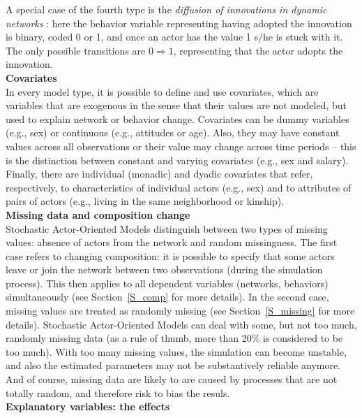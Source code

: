 \documentclass[a4paper,fleqn,11pt]{article}
\newcommand{\+}{\, + \,}
\newcommand{\saom}{{Stochastic Actor-Oriented Model}}
\begin{document}
A special case of the fourth type is the
\emph{diffusion of innovations in dynamic networks}
\citep{Greenan14}:
here the behavior variable representing
having adopted the innovation is binary, coded 0 or 1, and
once an actor has the value 1 s/he is stuck with it.
The only possible transitions are $0 \Rightarrow 1$, representing
that the actor adopts the innovation.\\

\noindent
\textbf{Covariates}\\

In every model type, it is possible to define and use covariates,
which are variables that are exogenous in the sense that
their values are not modeled, but used to explain network or behavior
change. Covariates can be dummy variables (e.g., sex)
or continuous (e.g., attitudes or age).
Also, they may have constant values across all observations or their
value may change across time periods -- this is the
distinction between constant and varying covariates
(e.g., sex and salary). Finally, there are
individual (monadic) and dyadic covariates that refer, respectively, to
characteristics of individual actors (e.g., sex) and to attributes
of pairs of actors (e.g., living in the same neighborhood or kinship).\\

\noindent
\textbf{Missing data and composition change}\\

{\saom}s distinguish between two types
of missing values: absence of actors from the network and
random missingness. The first case refers to changing composition:
it is possible to specify that some actors leave or join the
network between two observations (during the simulation process).
This then applies to all dependent variables (networks, behaviors)
simultaneously (see Section~\ref{S_comp} for more details).
In the second case, missing values are treated as randomly missing
(see Section~\ref{S_missing} for more details).
{\saom}s can deal with some, but not too much,
randomly missing data (as a rule of thumb, more than 20\% is
considered to be too much). With too many missing values,
the simulation can become unstable, and also the estimated
parameters may not be substantively reliable anymore.
And of course, missing data are likely to are caused by
processes that are not totally random, and therefore risk
to bias the resuls.\\

\noindent
\textbf{Explanatory variables: the effects}\\
\end{document}
